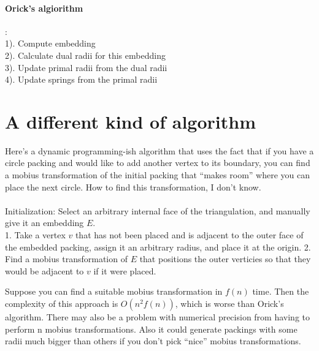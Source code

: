 \documentclass{article}
\begin{document}
\paragraph{Orick's algiorithm}
:\\
1). Compute embedding\\
2). Calculate dual radii for this embedding\\
3). Update primal radii from the dual radii\\
4). Update springs from the primal radii\\

\section{A different kind of algorithm}
Here's a dynamic programming-ish algorithm that uses the fact that if you have a circle packing and would like to add another vertex to its boundary, you can find a mobius transformation of the initial packing that "`makes room"' where you can place the next circle. How to find this transformation, I don't know.
\paragraph{}

Initialization: Select an arbitrary internal face of the triangulation, and manually give it an embedding $E$.\\
1. Take a vertex $v$ that has not been placed and is adjacent to the outer face of the embedded packing, assign it an arbitrary radius, and place it at the origin.
2. Find a mobius transformation of $E$ that positions the outer verticies so that they would be adjacent to $v$ if it were placed.

Suppose you can find a suitable mobius transformation in $f(n)$ time. Then the complexity of this approach is $O(n^2f(n))$, which is worse than Orick's algorithm. There may also be a problem with numerical precision from having to perform n mobius transformations. Also it could generate packings with some radii much bigger than others if you don't pick "`nice"' mobius transformations. 
\end{document}
